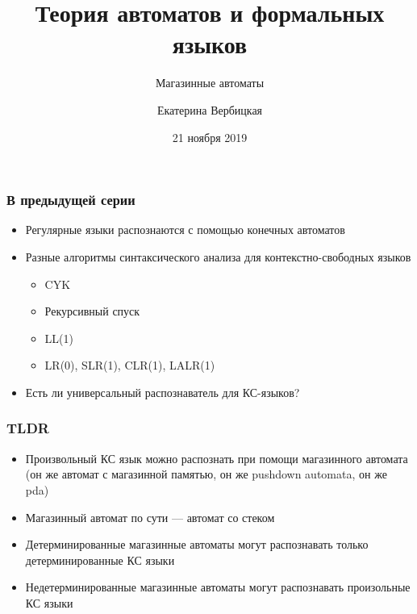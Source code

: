 \documentclass[dvipsnames]{beamer}
\title[]{Теория автоматов и формальных языков}
\subtitle[]{Магазинные автоматы}
\institute[]{
Санкт-Петербургский государственный электротехнический университет <<ЛЭТИ>>\\
}
\author[]{Екатерина Вербицкая}
\date{21 ноября 2019}
\begin{document}
{
  \begin{frame}
    \titlepage
  \end{frame}
}

\begin{frame}[fragile]
  \transwipe[direction=90]
  \frametitle{В предыдущей серии}
  \begin{itemize}
    \item Регулярные языки распознаются с помощью конечных автоматов
    \item Разные алгоритмы синтаксического анализа для контекстно-свободных языков
    \begin{itemize}
    	\item CYK
    	\item Рекурсивный спуск
    	\item LL(1)
    	\item LR(0), SLR(1), CLR(1), LALR(1)
    \end{itemize}
    \item Есть ли универсальный распознаватель для КС-языков?
  \end{itemize}
\end{frame}

\begin{frame}[fragile]
  \transwipe[direction=90]
  \frametitle{TLDR}
  \begin{itemize}
  	\item Произвольный КС язык можно распознать при помощи магазинного автомата (он же автомат с магазинной памятью, он же pushdown automata, он же pda)
  	\item Магазинный автомат по сути --- автомат со стеком
  	\item Детерминированные магазинные автоматы могут распознавать только детерминированные КС языки
  	\item Недетерминированные магазинные автоматы могут распознавать произольные КС языки
  \end{itemize}
\end{frame}
\end{document}
